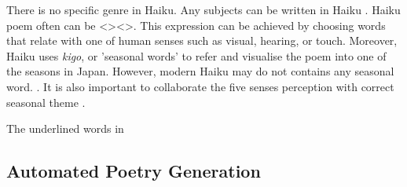 There is no specific genre in Haiku. Any subjects can be written in Haiku \cite{Haiku_JP}. Haiku poem often can be  <><>. This expression can be achieved by choosing words that relate with one of human senses such as visual, hearing, or touch. Moreover, Haiku uses \textit{kigo}, or 'seasonal words' to refer and visualise the poem into one of the seasons in Japan. However, modern Haiku may do not contains any seasonal word. \cite{Haiku_JP}. It is also important to collaborate the five senses perception with correct seasonal theme \cite{Haiku_poet}.




The underlined words in

\subsection{Automated Poetry Generation}




